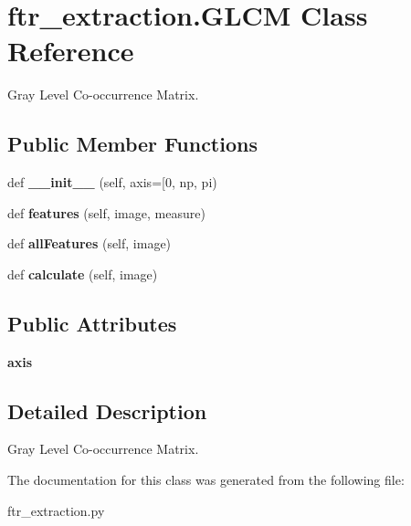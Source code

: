 \hypertarget{classftr__extraction_1_1_g_l_c_m}{}\section{ftr\+\_\+extraction.\+G\+L\+CM Class Reference}
\label{classftr__extraction_1_1_g_l_c_m}


Gray Level Co-\/occurrence Matrix.  


\subsection*{Public Member Functions}
\begin{DoxyCompactItemize}
\item 
\mbox{\label{classftr__extraction_1_1_g_l_c_m_a84be478dc4f08d4c20352816c35a4969}} 
def {\bfseries \+\_\+\+\_\+init\+\_\+\+\_\+} (self, axis=\mbox{[}0, np, pi)
\item 
\mbox{\label{classftr__extraction_1_1_g_l_c_m_a48ab7a7845018953ad4c6b098ed21b0d}} 
def {\bfseries features} (self, image, measure)
\item 
\mbox{\label{classftr__extraction_1_1_g_l_c_m_a1141aa314c9bfbf6face08832489ec8b}} 
def {\bfseries all\+Features} (self, image)
\item 
\mbox{\label{classftr__extraction_1_1_g_l_c_m_a7dfdce2f46e6eb8ecc5d0c0cb50644af}} 
def {\bfseries calculate} (self, image)
\end{DoxyCompactItemize}
\subsection*{Public Attributes}
\begin{DoxyCompactItemize}
\item 
\mbox{\label{classftr__extraction_1_1_g_l_c_m_a166e6b052a4d01bd6fd6cb49389832f6}} 
{\bfseries axis}
\end{DoxyCompactItemize}


\subsection{Detailed Description}
Gray Level Co-\/occurrence Matrix. 

The documentation for this class was generated from the following file\+:\begin{DoxyCompactItemize}
\item 
ftr\+\_\+extraction.\+py\end{DoxyCompactItemize}
